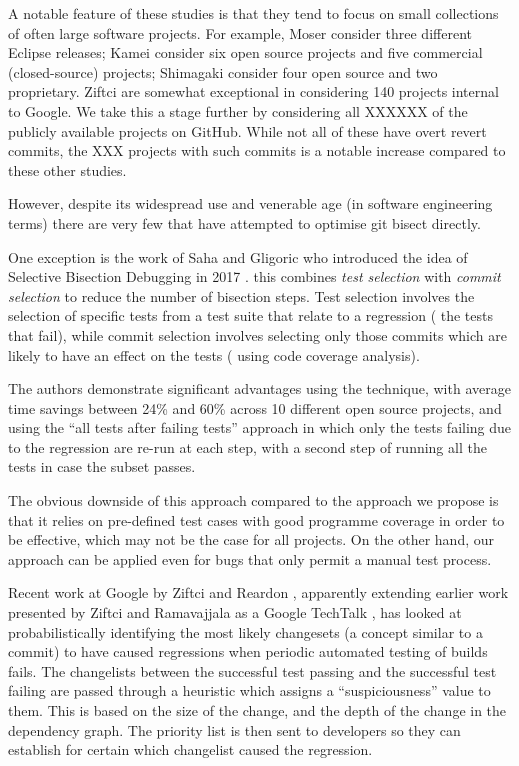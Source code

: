 \documentclass[10pt,journal,compsoc]{IEEEtran}
\begin{document}
A notable feature of these studies is that they tend to focus on small collections of often large software projects. For example, Moser \etal \cite{moser2008} consider three different Eclipse releases; Kamei \etal \cite{kamei2013} consider six open source projects and five commercial (closed-source) projects; Shimagaki \etal \cite{shimagaki2016} consider four open source and two proprietary. Ziftci \etal \cite{ziftci2013, ziftci2017} are somewhat exceptional in considering 140 projects internal to Google. We take this a stage further by considering all XXXXXX of the publicly available projects on GitHub. While not all of these have overt revert commits, the XXX projects with such commits is a notable increase compared to these other studies.

However, despite its widespread use and venerable age (in software engineering terms) there are very few that have attempted to optimise {\code git bisect} directly.

One exception is the work of Saha and Gligoric who introduced the idea of Selective Bisection Debugging in 2017 \cite{saha2017}. this combines {\it test selection\/} with {\it commit selection\/} to reduce the number of bisection steps. Test selection involves the selection of specific tests from a test suite that relate to a regression (\ie\/ the tests that fail), while commit selection involves selecting only those commits which are likely to have an effect on the tests (\eg\/ using code coverage analysis).

The authors demonstrate significant advantages using the technique, with average time savings between 24\% and 60\% across 10 different open source projects, and using the ``all tests after failing tests'' approach in which only the tests failing due to the regression are re-run at each step, with a second step of running all the tests in case the subset passes.

The obvious downside of this approach compared to the approach we propose is that it relies on pre-defined test cases with good programme coverage in order to be effective, which may not be the case for all projects. On the other hand, our approach can be applied even for bugs that only permit a manual test process.

Recent work at Google by Ziftci and Reardon \cite{ziftci2017}, apparently extending earlier work presented by Ziftci and Ramavajjala as a Google TechTalk \cite{ziftci2013}, has looked at probabilistically identifying the most likely changesets (a concept similar to a commit) to have caused regressions when periodic automated testing of builds fails. The changelists between the successful test passing and the successful test failing are passed through a heuristic which assigns a ``suspiciousness'' value to them. This is based on the size of the change, and the depth of the change in the dependency graph. The priority list is then sent to developers so they can establish for certain which changelist caused the regression. 
\end{document}
